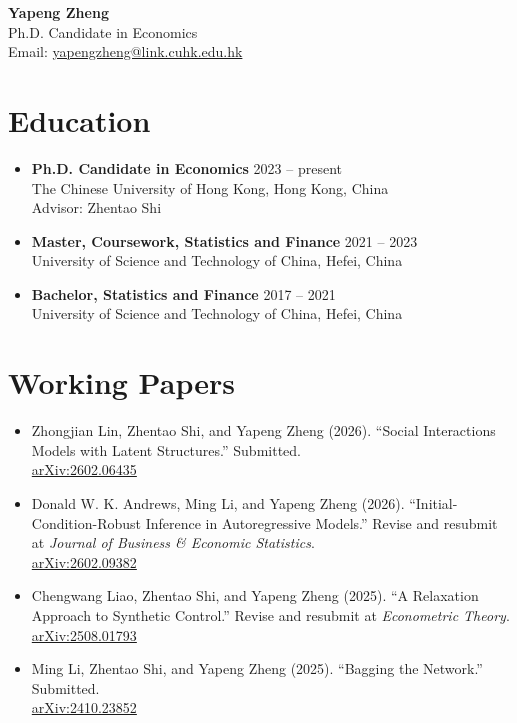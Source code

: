 \documentclass[11pt,a4paper]{article}
\begin{document}
\begin{center}
    {\LARGE\bfseries Yapeng Zheng}\\[0.4em]
    {\large Ph.D. Candidate in Economics}\\[0.3em]
    Email: \href{mailto:yapengzheng@link.cuhk.edu.hk}{yapengzheng@link.cuhk.edu.hk}
\end{center}

\vspace{0.5em}

\section{Education}
\begin{itemize}[leftmargin=0em, itemsep=0.4em, label={}]
    \item \textbf{Ph.D. Candidate in Economics} \hfill 2023 -- present\\
    The Chinese University of Hong Kong, Hong Kong, China\\
    Advisor: Zhentao Shi

    \item \textbf{Master, Coursework, Statistics and Finance} \hfill 2021 -- 2023\\
    University of Science and Technology of China, Hefei, China

    \item \textbf{Bachelor, Statistics and Finance} \hfill 2017 -- 2021\\
    University of Science and Technology of China, Hefei, China
\end{itemize}

\section{Working Papers}
\begin{itemize}[leftmargin=0em, itemsep=0.6em, label={}]
    \item Zhongjian Lin, Zhentao Shi, and Yapeng Zheng (2026). ``Social Interactions Models with Latent Structures.'' Submitted.\\
    \href{https://arxiv.org/pdf/2602.06435}{arXiv:2602.06435}

    \item Donald W. K. Andrews, Ming Li, and Yapeng Zheng (2026). ``Initial-Condition-Robust Inference in Autoregressive Models.'' Revise and resubmit at \emph{Journal of Business \& Economic Statistics}.\\
    \href{https://arxiv.org/pdf/2602.09382}{arXiv:2602.09382}

    \item Chengwang Liao, Zhentao Shi, and Yapeng Zheng (2025). ``A Relaxation Approach to Synthetic Control.'' Revise and resubmit at \emph{Econometric Theory}.\\
    \href{https://arxiv.org/abs/2508.01793}{arXiv:2508.01793}

    \item Ming Li, Zhentao Shi, and Yapeng Zheng (2025). ``Bagging the Network.'' Submitted.\\
    \href{https://arxiv.org/abs/2410.23852}{arXiv:2410.23852}
\end{itemize}
\end{document}
